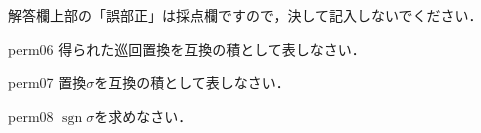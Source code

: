 \documentclass[a4paper]{ltjsarticle}
\DeclareMathOperator{\sgn}{sgn}
\begin{document}
{解答欄上部の「誤部正」は採点欄ですので，決して記入しないでください．

\vspace{1ex}
\hrulefill
\vspace{1ex}


\begin{question}{perm06}
得られた巡回置換を互換の積として表しなさい．
\end{question}
\begin{question}{perm07}
置換$\sigma$を互換の積として表しなさい．
\end{question}
\begin{question}{perm08}
\(\sgn\sigma\)を求めなさい．
\begin{choiceshoriz}
\end{choiceshoriz}
\end{question}
}
\end{document}
